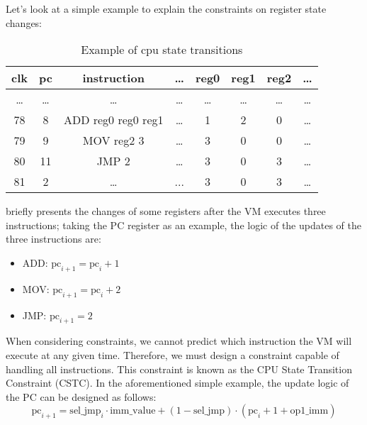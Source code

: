 Let's look at a simple example to explain the constraints on register state changes:
\begin{table}[!ht]
    \centering
    \begin{tabular}{|c|c|c|c|c|c|c|c|}
        \hline
        \rowcolor{gray} clk & pc    & instruction        & \dots & reg0  & reg1  & reg2  & \dots \\
        \hline
        \dots               & \dots & \dots              & \dots & \dots & \dots & \dots & \dots \\
        \hline
        78                  & 8     & ADD reg0 reg0 reg1 & \dots & 1     & 2     & 0     & \dots \\
        \hline
        79                  & 9     & MOV reg2 3         & \dots & 3     & 0     & 0     & \dots \\
        \hline
        80                  & 11    & JMP 2              & \dots & 3     & 0     & 3     & \dots \\
        \hline
        81                  & 2     & \dots              & ...   & 3     & 0     & 3     & \dots \\
        \hline
    \end{tabular}
    \caption{Example of cpu state transitions}
    \label{table:example-cpu-state-transitions}
\end{table}

 briefly presents the changes of some registers after the VM executes three
instructions; taking the PC register as an example, the logic of the updates of the three instructions are:
\begin{itemize}
    \item ADD: $\mathrm{pc}_{i+1} = \mathrm{pc}_i + 1$
    \item MOV: $\mathrm{pc}_{i+1} = \mathrm{pc}_i + 2$
    \item JMP: $\mathrm{pc}_{i+1} = 2$
\end{itemize}

When considering constraints, we cannot predict which instruction the VM will execute at any given time. 
Therefore, we must design a constraint capable of handling all instructions. This constraint is known as the CPU State Transition Constraint (CSTC). 
In the aforementioned simple example, the update logic of the PC can be designed as follows:
\[ \mathrm{pc}_{i+1} = \mathrm{sel\_jmp}_i \cdot \mathrm{imm\_value} + (1 - \mathrm{sel\_jmp}) \cdot (\mathrm{pc}_i + 1 + \mathrm{op1\_imm}) \]

